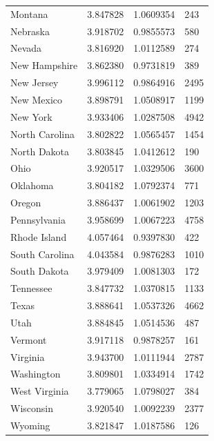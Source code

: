 \documentclass[
  english,
  man]{apa6}
\begin{document}
\begin{landscape}
\begin{longtable}[t]{llll}
\addlinespace
Montana & 3.847828 & 1.0609354 & 243\\
Nebraska & 3.918702 & 0.9855573 & 580\\
Nevada & 3.816920 & 1.0112589 & 274\\
New Hampshire & 3.862380 & 0.9731819 & 389\\
New Jersey & 3.996112 & 0.9864916 & 2495\\
\addlinespace
New Mexico & 3.898791 & 1.0508917 & 1199\\
New York & 3.933406 & 1.0287508 & 4942\\
North Carolina & 3.802822 & 1.0565457 & 1454\\
North Dakota & 3.803845 & 1.0412612 & 190\\
Ohio & 3.920517 & 1.0329506 & 3600\\
\addlinespace
Oklahoma & 3.804182 & 1.0792374 & 771\\
Oregon & 3.886437 & 1.0061902 & 1203\\
Pennsylvania & 3.958699 & 1.0067223 & 4758\\
Rhode Island & 4.057464 & 0.9397830 & 422\\
South Carolina & 4.043584 & 0.9876283 & 1010\\
\addlinespace
South Dakota & 3.979409 & 1.0081303 & 172\\
Tennessee & 3.847732 & 1.0370815 & 1133\\
Texas & 3.888641 & 1.0537326 & 4662\\
Utah & 3.884845 & 1.0514536 & 487\\
Vermont & 3.917118 & 0.9878257 & 161\\
\addlinespace
Virginia & 3.943700 & 1.0111944 & 2787\\
Washington & 3.809801 & 1.0334914 & 1742\\
West Virginia & 3.779065 & 1.0798027 & 384\\
Wisconsin & 3.920540 & 1.0092239 & 2377\\
Wyoming & 3.821847 & 1.0187586 & 126\\*
\end{longtable}
\end{landscape}
\endgroup{}

\begingroup\fontsize{12}{14}\selectfont
\end{document}
